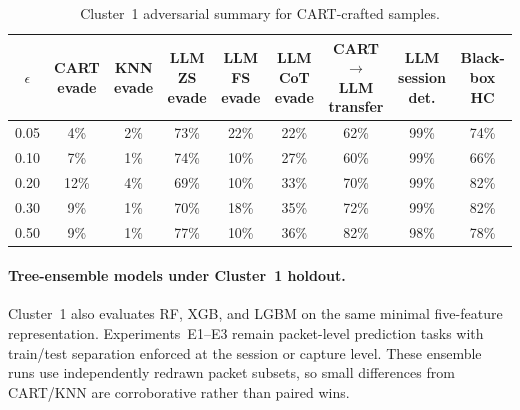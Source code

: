\documentclass[letterpaper,twocolumn,10pt]{article}
\begin{document}
\begin{table}[t]
\centering
\caption{Cluster~1 adversarial summary for CART-crafted samples.}
\label{tab:strict-adv}
\footnotesize
\begin{adjustbox}{width=\textwidth}
\begin{tabular}{ccccccccc}
\toprule
$\epsilon$ & CART evade & KNN evade & LLM ZS evade & LLM FS evade & LLM CoT evade & CART$\rightarrow$LLM transfer & LLM session det. & Black-box HC \\
\midrule
0.05 & 4\%  & 2\% & 73\% & 22\% & 22\% & 62\% & 99\% & 74\% \\
0.10 & 7\%  & 1\% & 74\% & 10\% & 27\% & 60\% & 99\% & 66\% \\
0.20 & 12\% & 4\% & 69\% & 10\% & 33\% & 70\% & 99\% & 82\% \\
0.30 & 9\%  & 1\% & 70\% & 18\% & 35\% & 72\% & 99\% & 82\% \\
0.50 & 9\%  & 1\% & 77\% & 10\% & 36\% & 82\% & 98\% & 78\% \\
\bottomrule
\end{tabular}
\end{adjustbox}
\end{table}


\paragraph{Tree-ensemble models under Cluster~1 holdout.}
\label{subsec:strict-ensembles}

Cluster~1 also evaluates RF, XGB, and LGBM on the same minimal five-feature representation. Experiments~E1--E3 remain packet-level prediction tasks with train/test separation enforced at the session or capture level. These ensemble runs use independently redrawn packet subsets, so small differences from CART/KNN are corroborative rather than paired wins.

\begin{table}[t]
\centering
\caption{Cluster~1 tree-ensemble results. Cell reports accuracy with malicious-class $F_1$ in parentheses. E1 and E2 are mixed-traffic packet tasks under grouped holdout, E3 is encrypted-only, and LOFO columns report macro-averages over five held-out malware families.}
\label{tab:strict-tree-ensembles}
\footnotesize
{}
\end{table}
\end{document}
